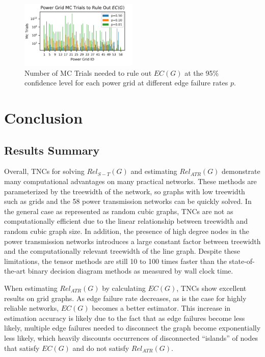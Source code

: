 \begin{figure}[t]
\caption{Number of MC Trials needed to rule out $EC(G)$ at the 95\% confidence level for each power grid at different edge failure rates $p$.}
\label{fig:Power Grid MC}
\includegraphics[width=0.5\textwidth]{../figures/PowerGridMC.png}
\end{figure}

\hypertarget{conclusion}{%
\section{Conclusion}\label{conclusion}}

\hypertarget{results-summary}{%
\subsection{Results Summary}\label{results-summary}}

Overall, TNCs for solving \(Rel_{S-T}(G)\) and estimating \(Rel_{ATR}(G)\) demonstrate many computational advantages on many practical networks. These methods are parameterized by the treewidth of the network, so graphs with low treewidth such as grids and the 58 power transmission networks can be quickly solved. In the general case as represented as random cubic graphs, TNCs are not as computationally efficient due to the linear relationship between treewidth and random cubic graph size. In addition, the presence of high degree nodes in the power transmission networks introduces a large constant factor between treewidth and the computationally relevant treewidth of the line graph. Despite these limitations, the tensor methods are still 10 to 100 times faster than the state-of-the-art binary decision diagram methods as measured by wall clock time.

When estimating \(Rel_{ATR}(G)\) by calculating \(EC(G)\), TNCs show excellent results on grid graphs. As edge failure rate decreases, as is the case for highly reliable networks, \(EC(G)\) becomes a better estimator. This increase in estimation accuracy is likely due to the fact that as edge failures become less likely, multiple edge failures needed to disconnect the graph become exponentially less likely, which heavily discounts occurrences of disconnected ``islands'' of nodes that satisfy \(EC(G)\) and do not satisfy \(Rel_{ATR}(G)\).

